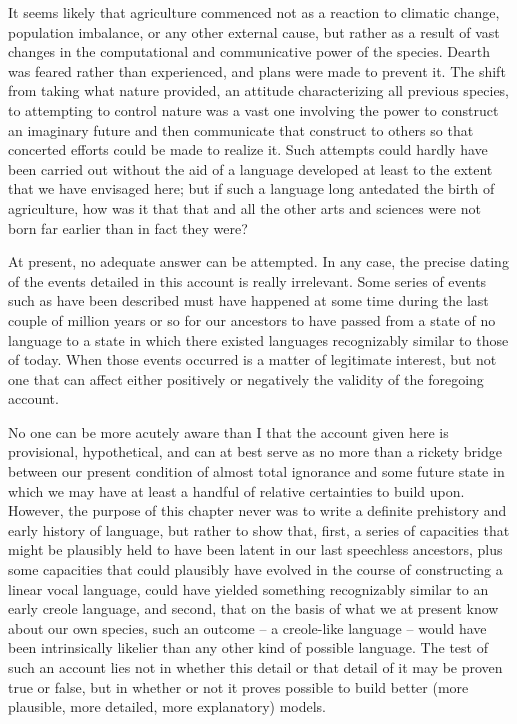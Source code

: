 It seems likely that agriculture commenced not as a reaction to climatic change, population imbalance, or any other external cause, but rather as a result of vast changes in the computational and com\-municative power of the species. Dearth was feared rather than experienced,
and plans were made to prevent it. The shift from taking what nature provided, an attitude characterizing all previous species, to attempting to control nature was a vast one involving the power to construct an imaginary future and then communicate that construct to others so that concerted efforts could be made to realize it. Such attempts could hardly have been carried out without the aid of a language developed at least to the extent that we have envisaged here; but if such a language long antedated the birth of agriculture, how was it that that and all the other arts and sciences were not born far earlier than in fact they were?

At present, no adequate answer can be attempted. In any case, the precise dating of the events detailed in this account is really irrelevant. Some series of events such as have been described must have happened at some time during the last couple of million years or so for our ancestors to have passed from a state of no language to a state in which there existed languages recognizably similar to those of today. When those events occurred is a matter of legitimate interest, but not one that can affect either positively or negatively the validity of the foregoing account.

No one can be more acutely aware than I that the account given here is provisional, hypothetical, and can at best serve as no more than a rickety bridge between our present condition of almost total ignorance and some future state in which we may have at least a handful of relative certainties to build upon. However, the purpose of this chapter never was to write a definite prehistory and early history of language, but rather to show that, first, a series of capacities that might be plausibly held to have been latent in our last speechless ancestors, plus some capacities that could plausibly have evolved in the course of constructing a linear vocal language, could have yielded something recognizably similar to an early creole language, and second, that on the basis of what we at present know about our own species, such an outcome -- a creole-like language -- would have been intrinsically likelier than any other kind of possible language. The test of such an account lies not in whether this detail or that detail of it may be proven true
or false, but in whether or not it proves possible to build better (more plausible, more detailed, more explanatory) models.

